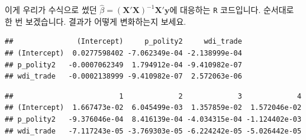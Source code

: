 \documentclass[
]{book}
\newenvironment{Shaded}{\begin{snugshade}}{\end{snugshade}}
\newcommand{\CommentTok}[1]{\textcolor[rgb]{0.56,0.35,0.01}{\textit{#1}}}
\newcommand{\DecValTok}[1]{\textcolor[rgb]{0.00,0.00,0.81}{#1}}
\newcommand{\KeywordTok}[1]{\textcolor[rgb]{0.13,0.29,0.53}{\textbf{#1}}}
\newcommand{\NormalTok}[1]{#1}
\newcommand{\OperatorTok}[1]{\textcolor[rgb]{0.81,0.36,0.00}{\textbf{#1}}}
\newcommand{\StringTok}[1]{\textcolor[rgb]{0.31,0.60,0.02}{#1}}
\begin{document}
이게 우리가 수식으로 썼던 \(\hat{\beta} = (\textbf{X}'\textbf{X})^{-1}\textbf{X}'\textbf{y}\)에 대응하는 \texttt{R} 코드입니다. 순서대로 한 번 보겠습니다. 결과가 어떻게 변화하는지 보세요.

\begin{Shaded}
\end{Shaded}

\begin{verbatim}
##               (Intercept)     p_polity2     wdi_trade
## (Intercept)  0.0277598402 -7.062349e-04 -2.138999e-04
## p_polity2   -0.0007062349  1.794912e-04 -9.410982e-07
## wdi_trade   -0.0002138999 -9.410982e-07  2.572063e-06
\end{verbatim}

\begin{Shaded}
\end{Shaded}

\begin{verbatim}
##                         1             2             3             4
## (Intercept)  1.667473e-02  6.045499e-03  1.357859e-02  1.572046e-02
## p_polity2   -9.376046e-04  8.416139e-04 -4.034315e-04 -1.124402e-03
## wdi_trade   -7.117243e-05 -3.769303e-05 -6.224242e-05 -5.026442e-05
\end{verbatim}

\begin{Shaded}
\end{Shaded}
\end{document}
